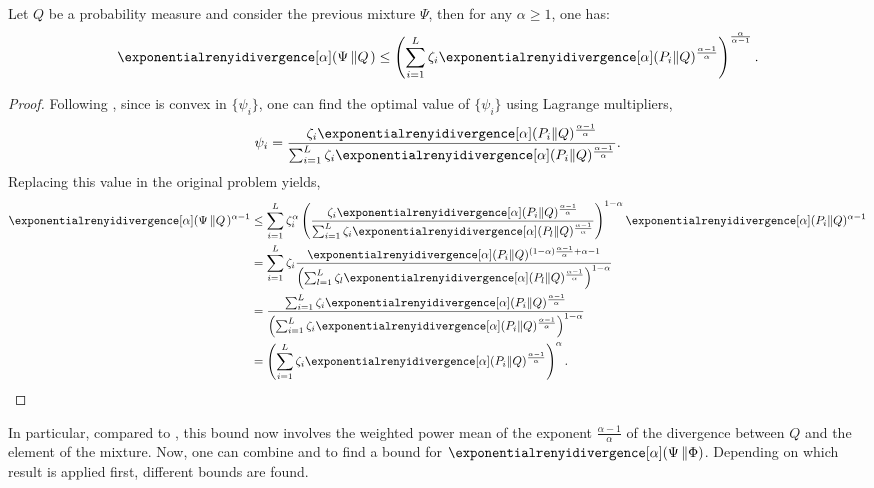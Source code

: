 \begin{prop}
\label{pp:mix_psi}
    Let $Q$ be a probability measure and consider the previous mixture $\Psi$, then for any $\alpha\geq1$, one has:
    \begin{align*}
        \exponentialrenyidivergence[\alpha](\Psi\left\Vert Q\right.) \leq \left(\sum_{i=1}^L \zeta_i \exponentialrenyidivergence[\alpha](P_i\Vert Q)^{\frac{\alpha-1}{\alpha}}\right)^{\frac{\alpha}{\alpha-1}}.
    \end{align*}
\end{prop}
\begin{proof}
Following \cite{papini2019optimistic}, since  is convex in $\{\psi_i\}$, one can find the optimal value of $\{\psi_i\}$ using Lagrange multipliers,
\begin{align*}
    \psi_i = \frac{\zeta_i \exponentialrenyidivergence[\alpha](P_i \Vert Q)^{\frac{\alpha-1}{\alpha}}}{\sum_{i=1}^L \zeta_i \exponentialrenyidivergence[\alpha](P_i\Vert Q)^{\frac{\alpha-1}{\alpha}}}.
\end{align*}
Replacing this value in the original problem yields,
\begin{align*}
    \exponentialrenyidivergence[\alpha](\Psi\left\Vert Q\right.)^{\alpha-1} 
    &\leq \sum_{i=1}^L \zeta_i^\alpha \left(\frac{\zeta_i \exponentialrenyidivergence[\alpha](P_i \Vert Q)^{\frac{\alpha-1}{\alpha}}}{\sum_{i=1}^L \zeta_i \exponentialrenyidivergence[\alpha](P_l\Vert Q)^{\frac{\alpha-1}{\alpha}}} \right)^{1-\alpha} \exponentialrenyidivergence[\alpha](P_i \Vert Q)^{\alpha-1}
    \\
    &= \sum_{i=1}^L \zeta_i\frac{ \exponentialrenyidivergence[\alpha](P_i \Vert Q)^{(1-\alpha)\frac{\alpha-1}{\alpha} +\alpha-1}}{\left(\sum_{l=1}^L \zeta_l \exponentialrenyidivergence[\alpha](P_l\Vert Q)^{\frac{\alpha-1}{\alpha}}\right)^{1-\alpha}} 
    \\
    &= \frac{\sum_{i=1}^L \zeta_i \exponentialrenyidivergence[\alpha](P_i \Vert Q)^{\frac{\alpha-1}{\alpha} }}{\left(\sum_{i=1}^L \zeta_i \exponentialrenyidivergence[\alpha](P_i\Vert Q)^{\frac{\alpha-1}{\alpha}}\right)^{1-\alpha}} 
    \\
    &= \left(\sum_{i=1}^L \zeta_i \exponentialrenyidivergence[\alpha](P_i\Vert Q)^{\frac{\alpha-1}{\alpha}}\right)^{\alpha} .
\end{align*}
\end{proof}

In particular, compared to , this bound now involves the weighted power mean of the exponent $\textstyle\frac{\alpha-1}{\alpha}$ of the \Renyi divergence between $Q$ and the element of the mixture. 
Now, one can combine  and  to find a bound for $\exponentialrenyidivergence[\alpha](\Psi\left\Vert\Phi\right)$. 
Depending on which result is applied first, different bounds are found.


